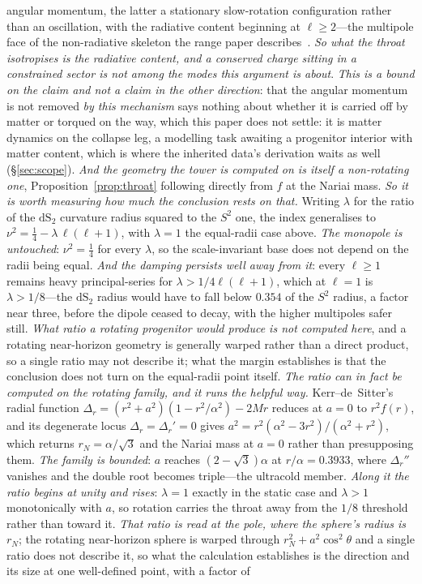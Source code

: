 \documentclass[11pt,a4paper]{article}
\theoremstyle{plain}
\theoremstyle{definition}
\theoremstyle{remark}
\newcommand{\dS}{\mathrm{dS}}
\begin{document}
angular momentum, the latter a stationary slow-rotation configuration rather than an oscillation, with the radiative content beginning at $\ell\ge2$---the multipole face of the non-radiative skeleton the range paper describes~\cite{JanzenRange}. \emph{So what the throat isotropises is the radiative content, and a conserved charge sitting in a constrained sector is not among the modes this argument is about}. \emph{This is a bound on the claim and not a claim in the other direction}: that the angular momentum is not removed \emph{by this mechanism} says nothing about whether it is carried off by matter or torqued on the way, which this paper does not settle: it is matter dynamics on the collapse leg, a modelling task awaiting a progenitor interior with matter content, which is where the inherited data's derivation waits as well (\S\ref{sec:scope}). \emph{And the geometry the tower is computed on is itself a non-rotating one}, Proposition~\ref{prop:throat} following directly from $f$ at the Nariai mass. \emph{So it is worth measuring how much the conclusion rests on that.} Writing $\lambda$ for the ratio of the $\dS_2$ curvature radius squared to the $S^2$ one, the index generalises to $\nu^2=\tfrac14-\lambda\,\ell(\ell+1)$, with $\lambda=1$ the equal-radii case above. \emph{The monopole is untouched}: $\nu^2=\tfrac14$ for every $\lambda$, so the scale-invariant base does not depend on the radii being equal. \emph{And the damping persists well away from it}: every $\ell\ge1$ remains heavy principal-series for $\lambda>1/4\ell(\ell+1)$, which at $\ell=1$ is $\lambda>1/8$---the $\dS_2$ radius would have to fall below $0.354$ of the $S^2$ radius, a factor near three, before the dipole ceased to decay, with the higher multipoles safer still. \emph{What ratio a rotating progenitor would produce is not computed here}, and a rotating near-horizon geometry is generally warped rather than a direct product, so a single ratio may not describe it; what the margin establishes is that the conclusion does not turn on the equal-radii point itself. \emph{The ratio can in fact be computed on the rotating family, and it runs the helpful way.} Kerr--de~Sitter's radial function $\Delta_r=(r^2+a^2)(1-r^2/\alpha^2)-2Mr$ reduces at $a=0$ to $r^2f(r)$, and its degenerate locus $\Delta_r=\Delta_r'=0$ gives $a^2=r^2(\alpha^2-3r^2)/(\alpha^2+r^2)$, which returns $r_{N}=\alpha/\sqrt3$ and the Nariai mass at $a=0$ rather than presupposing them. \emph{The family is bounded}: $a$ reaches $(2-\sqrt3)\alpha$ at $r/\alpha=0.3933$, where $\Delta_r''$ vanishes and the double root becomes triple---the ultracold member. \emph{Along it the ratio begins at unity and rises}: $\lambda=1$ exactly in the static case and $\lambda>1$ monotonically with $a$, so rotation carries the throat away from the $1/8$ threshold rather than toward it. \emph{That ratio is read at the pole, where the sphere's radius is $r_N$}; the rotating near-horizon sphere is warped through $r_N^2+a^2\cos^2\theta$ and a single ratio does not describe it, so what the calculation establishes is the direction and its size at one well-defined point, with a factor of 
\end{document}
